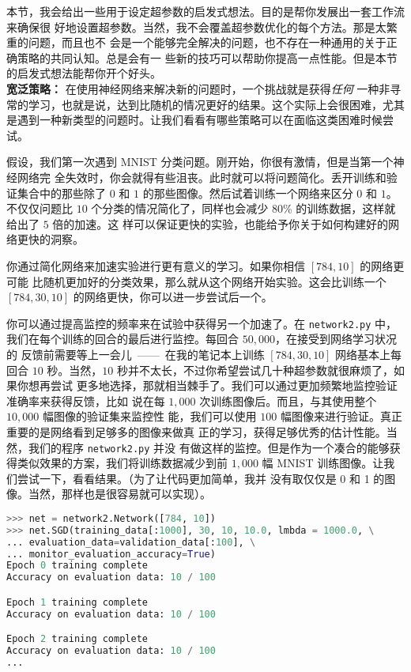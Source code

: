 本节，我会给出一些用于设定超参数的启发式想法。目的是帮你发展出一套工作流来确保很
好地设置超参数。当然，我不会覆盖超参数优化的每个方法。那是太繁重的问题，而且也不
会是一个能够完全解决的问题，也不存在一种通用的关于正确策略的共同认知。总是会有一
些新的技巧可以帮助你提高一点性能。但是本节的启发式想法能帮你开个好头。\\

\textbf{宽泛策略：} 在使用神经网络来解决新的问题时，一个挑战就是获得\emph{任何}
一种非寻常的学习，也就是说，达到比随机的情况更好的结果。这个实际上会很困难，尤其
是遇到一种新类型的问题时。让我们看看有哪些策略可以在面临这类困难时候尝试。

假设，我们第一次遇到 MNIST 分类问题。刚开始，你很有激情，但是当第一个神经网络完
全失效时，你会就得有些沮丧。此时就可以将问题简化。丢开训练和验证集合中的那些除了
$0$ 和 $1$ 的那些图像。然后试着训练一个网络来区分 $0$ 和 $1$。不仅仅问题比 $10$
个分类的情况简化了，同样也会减少 80\% 的训练数据，这样就给出了 $5$ 倍的加速。这
样可以保证更快的实验，也能给予你关于如何构建好的网络更快的洞察。

你通过简化网络来加速实验进行更有意义的学习。如果你相信 $[784, 10]$ 的网络更可能
比随机更加好的分类效果，那么就从这个网络开始实验。这会比训练一个 $[784, 30 ,10]$
的网络更快，你可以进一步尝试后一个。

你可以通过提高监控的频率来在试验中获得另一个加速了。在 \lstinline!network2.py!
中，我们在每个训练的回合的最后进行监控。每回合 $50,000$，在接受到网络学习状况的
反馈前需要等上一会儿~——~在我的笔记本上训练 $[784, 30, 10]$ 网络基本上每回合 $10$
秒。当然，$10$ 秒并不太长，不过你希望尝试几十种超参数就很麻烦了，如果你想再尝试
更多地选择，那就相当棘手了。我们可以通过更加频繁地监控验证准确率来获得反馈，比如
说在每 $1,000$ 次训练图像后。而且，与其使用整个 $10,000$ 幅图像的验证集来监控性
能，我们可以使用 $100$ 幅图像来进行验证。真正重要的是网络看到足够多的图像来做真
正的学习，获得足够优秀的估计性能。当然，我们的程序 \lstinline!network2.py! 并没
有做这样的监控。但是作为一个凑合的能够获得类似效果的方案，我们将训练数据减少到前
$1,000$ 幅 MNIST 训练图像。让我们尝试一下，看看结果。（为了让代码更加简单，我并
  没有取仅仅是 0 和 1 的图像。当然，那样也是很容易就可以实现）。
\begin{lstlisting}[language=Python]
>>> net = network2.Network([784, 10])
>>> net.SGD(training_data[:1000], 30, 10, 10.0, lmbda = 1000.0, \
... evaluation_data=validation_data[:100], \
... monitor_evaluation_accuracy=True)
Epoch 0 training complete
Accuracy on evaluation data: 10 / 100

Epoch 1 training complete
Accuracy on evaluation data: 10 / 100

Epoch 2 training complete
Accuracy on evaluation data: 10 / 100
...
\end{lstlisting}

